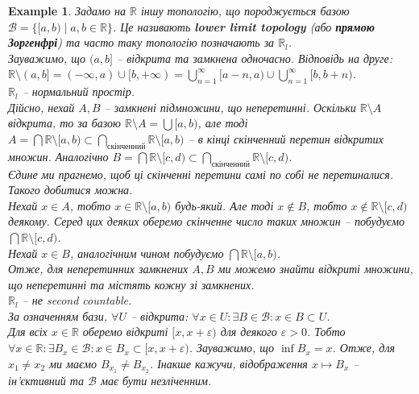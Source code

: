\documentclass[a4paper, 10pt]{article}
\theoremstyle{theoremdd}
\newtheorem{example}[theorem]{Example}
\begin{document}
\begin{example}
Задамо на $\mathbb{R}$ іншу топологію, що породжується базою $\mathcal{B} = \{ [a,b) \mid a,b \in \mathbb{R} \}$. Це називають \textbf{lower limit topology} (або \textbf{прямою Зоргенфрі}) та часто таку топологію позначають за $\mathbb{R}_l$.\\
Зауважимо, що $(a,b]$ -- відкрита та замкнена одночасно. Відповідь на друге:\\
$\mathbb{R} \setminus (a,b] = (-\infty,a) \cup [b,+\infty) = \displaystyle\bigcup_{n=1}^\infty [a-n,a) \cup \bigcup_{n=1}^\infty [b,b+n)$.
\bigskip \\
\textit{$\mathbb{R}_l$ -- нормальний простір.}\\
Дійсно, нехай $A,B$ -- замкнені підмножини, що неперетинні. Оскільки $\mathbb{R} \setminus A$ відкрита, то за базою $\mathbb{R} \setminus A = \displaystyle\bigcup [a,b)$, але тоді $A = \displaystyle\bigcap \mathbb{R} \setminus [a,b) \subset \bigcap_{\text{скінченний}} \mathbb{R} \setminus [a,b)$ -- в кінці скінченний перетин відкритих множин. Аналогічно $B = \displaystyle\bigcap \mathbb{R} \setminus [c,d) \subset \bigcap_{\text{скінченний}} \mathbb{R} \setminus [c,d)$.\\
Єдине ми прагнемо, щоб ці скінченні перетини самі по собі не перетиналися. Такого добитися можна.\\
Нехай $x \in A$, тобто $x \in \mathbb{R} \setminus [a,b)$ будь-який. Але тоді $x \notin B$, тобто $x \notin \mathbb{R} \setminus [c,d)$ деякому. Серед цих деяких оберемо скінченне число таких множин -- побудуємо $\displaystyle\bigcap \mathbb{R} \setminus [c,d)$.\\
Нехай $x \in B$, аналогічним чином побудуємо $\displaystyle\bigcap \mathbb{R} \setminus [a,b)$.\\
Отже, для неперетинних замкнених $A,B$ ми можемо знайти відкриті множини, що неперетинні та містять кожну зі замкнених.
\bigskip \\
\textit{$\mathbb{R}_l$ -- не second countable.}\\
За означенням бази, $\forall U$ -- відкрита: $\forall x \in U: \exists B \in \mathcal{B}: x \in B \subset U$.\\
Для всіх $x \in \mathbb{R}$ оберемо відкриті $[x,x+\varepsilon)$ для деякого $\varepsilon > 0$. Тобто $\forall x \in \mathbb{R}: \exists B_x \in \mathcal{B}: x \in B_x \subset [x,x+\varepsilon)$. Зауважимо, що $\inf B_x = x$. Отже, для $x_1 \neq x_2$ ми маємо $B_{x_1} \neq B_{x_2}$. Інакше кажучи, відображення $x \mapsto B_x$ -- ін'єктивний та $\mathcal{B}$ має бути незліченним.

\end{example}
\end{document}
